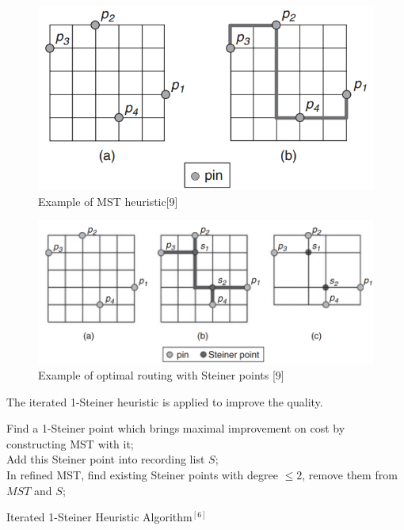 \documentclass[11pt,twoside, onecolumn]{IEEEtran}
\begin{document}
\begin{figure}[hbt]
	\begin{center}
	\includegraphics[scale=0.4]{MST.png}
	\end{center}
	\caption{Example of MST heuristic[9]}
	\label{fig:MST}
\end{figure}

\begin{figure}[hbt]
	\begin{center}
	\includegraphics[scale=0.4]{Steiner.png}
	\end{center}
	\caption{Example of optimal routing with Steiner points [9]}
	\label{fig:Steiner}
\end{figure}

The iterated 1-Steiner heuristic is applied to improve the quality. 
\begin{algorithm}[hbt]
\SetAlgoNoLine
  {
  	Find a 1-Steiner point which brings maximal improvement on cost by constructing MST with it;\\
  	Add this Steiner point into recording list $S$;\\
  	In refined MST, find existing Steiner points with degree $\leq 2$, remove them from $MST$ and $S$;
  }
\caption{Iterated 1-Steiner Heuristic Algorithm$^{[6]}$}\label{alg:iter}
\end{algorithm}
\end{document}
